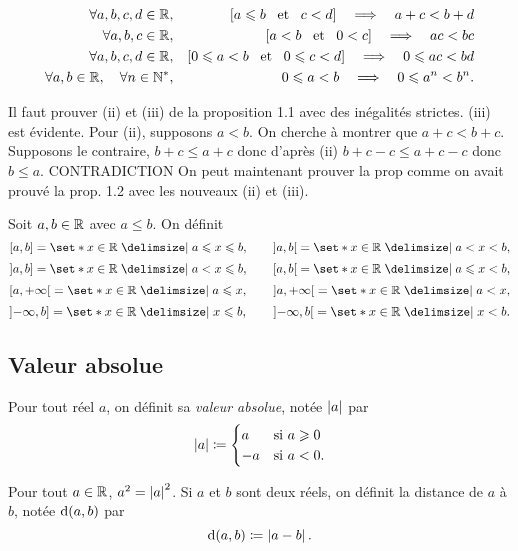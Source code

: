 \documentclass{magnolia}
\begin{document}
\begin{proposition}
\begin{eqnarray*}
\forall a,b,c,d\in\mathbb{R}, & & \left[a\leqslant b \quad\!\text{et}\quad\! c< d\right]\quad\Longrightarrow\quad
       a+c< b+d\\
\forall a,b,c\in\mathbb{R}, & & \left[a< b \quad\!\text{et}\quad\! 0< c\right]\quad\Longrightarrow\quad ac< bc\\
\forall a,b,c,d\in\mathbb{R}, & & \left[0\leqslant a< b \quad\!\text{et}\quad\! 0\leqslant c< d\right]\quad\Longrightarrow\quad
       0\leqslant ac< bd\\
\forall a,b\in\mathbb{R}, \quad \forall n\in{\mathbb{N}^*}, & & 0\leqslant a< b \quad\Longrightarrow\quad
  0\leqslant a^n< b^n.
\end{eqnarray*}
\end{proposition}

\begin{preuve}
Il faut prouver (ii) et (iii) de la proposition 1.1 avec des inégalités strictes.
(iii) est évidente.
Pour (ii), supposons $a<b$. On cherche à montrer que $a+c<b+c$. Supposons le contraire, $b+c\leq a+c$ donc d'après (ii) $b+c-c\leq a+c-c$ donc $b\leq a$. CONTRADICTION
On peut maintenant prouver la prop comme on avait prouvé la prop. 1.2 avec les nouveaux (ii) et (iii).
\end{preuve}


\begin{definition}[utile=-3]
Soit $a,b\in\mathbb{R}$ avec $a\leq b$. On définit
\[\interf{a}{b}=\enstq{x\in\R}{a\leq x\leq b}, \qquad
  \intero{a}{b}=\enstq{x\in\R}{a< x< b},\]
\[\interof{a}{b}=\enstq{x\in\R}{a< x\leq b}, \qquad
  \interfo{a}{b}=\enstq{x\in\R}{a\leq x< b},\]
\[\interfo{a}{+\infty}=\enstq{x\in\R}{a\leq x}, \qquad
  \intero{a}{+\infty}=\enstq{x\in\R}{a< x},\]
\[\interof{-\infty}{b}=\enstq{x\in\R}{x\leq b}, \qquad
  \intero{-\infty}{b}=\enstq{x\in\R}{x< b}.\]
\end{definition}

\subsection{Valeur absolue}

\begin{definition}[utile=-3]
Pour tout réel $a$, on définit sa \emph{valeur absolue}, notée $\left|a\right|$ par
  \[\left|a\right|\coloneqq
    \begin{cases}
    a  & \text{si $a\geqslant 0$}\\
    -a & \text{si $a<0$.}
    \end{cases}\]
\end{definition}

\begin{remarques}
\remarque Pour tout $a\in\mathbb{R}$, $a^2=\left|a\right|^2$.
\remarque Si $a$ et $b$ sont deux réels, on définit la distance de $a$ à $b$,
  notée ${\rm d}\!\left(a,b\right)$ par
  \[{\rm d}\!\left(a,b\right)\coloneqq\left|a-b\right|.\]
\end{remarques}
\end{document}
